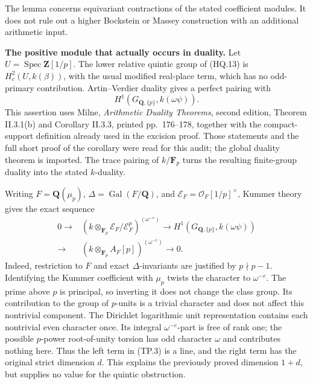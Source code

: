 \documentclass[11pt,a4paper]{article}
\theoremstyle{definition}
\renewcommand{\paragraph}[1]{\par\smallskip\noindent\textbf{#1}\quad\ignorespaces}
\begin{document}
The lemma concerns equivariant contractions of the stated
coefficient modules.  It does not rule out a higher
Bockstein or Massey construction with an additional
arithmetic input.

\paragraph{The positive module that actually occurs in duality.}
Let \(U=\operatorname{Spec}\mathbf Z[1/p]\).
The lower relative quintic group of (HQ.13) is
\(H_c^2(U,k(\beta))\), with the usual modified real-place
term, which has no odd-primary contribution.  Artin--Verdier
duality gives a perfect pairing with
\[
 H^1(G_{\mathbf Q,\{p\}},k(\omega\psi)).
 \tag{TP.2}
\]
This assertion uses Milne, \emph{Arithmetic Duality Theorems},
second edition, Theorem II.3.1(b) and Corollary II.3.3,
printed pp.~176--178, together with the compact-support
definition already used in the excision proof.  Those
statements and the full short proof of the corollary were
read for this audit; the global duality theorem is imported.
The trace pairing of \(k/\mathbf F_p\) turns the resulting
finite-group duality into the stated \(k\)-duality.

Writing \(F=\mathbf Q(\mu_p)\), \(\Delta=\operatorname{Gal}(F/\mathbf Q)\),
and \(\mathcal E_F=\mathcal O_F[1/p]^\times\), Kummer
theory gives the exact sequence
\[
\begin{split}
0\longrightarrow&
 (k\otimes_{\mathbf F_p}\mathcal E_F/\mathcal E_F^p)^{(\omega^{-e})}
 \longrightarrow H^1(G_{\mathbf Q,\{p\}},k(\omega\psi))\\
 \longrightarrow&
 (k\otimes_{\mathbf F_p}A_F[p])^{(\omega^{-e})}
 \longrightarrow0.
\end{split}
 \tag{TP.3}
\]
Indeed, restriction to \(F\) and exact \(\Delta\)-invariants
are justified by \(p\nmid p-1\).  Identifying the Kummer
coefficient with \(\mu_p\) twists the character to
\(\omega^{-e}\).  The prime above \(p\) is principal,
so inverting it does not change the class group.
Its contribution to the group of \(p\)-units is a trivial
character and does not affect this nontrivial component.
The Dirichlet logarithmic unit representation contains
each nontrivial even character once.  Its integral
\(\omega^{-e}\)-part is free of rank one; the possible
\(p\)-power root-of-unity torsion has odd character
\(\omega\) and contributes nothing here.
Thus the left term in (TP.3) is a line, and the right
term has the original strict dimension \(d\).
This explains the previously proved dimension \(1+d\),
but supplies no value for the quintic obstruction.
\end{document}
